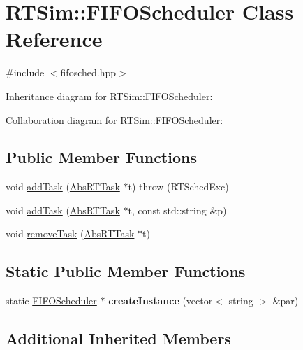 \hypertarget{classRTSim_1_1FIFOScheduler}{}\section{R\+T\+Sim\+:\+:F\+I\+F\+O\+Scheduler Class Reference}
\label{classRTSim_1_1FIFOScheduler}


{\ttfamily \#include $<$fifosched.\+hpp$>$}



Inheritance diagram for R\+T\+Sim\+:\+:F\+I\+F\+O\+Scheduler\+:


Collaboration diagram for R\+T\+Sim\+:\+:F\+I\+F\+O\+Scheduler\+:
\subsection*{Public Member Functions}
\begin{DoxyCompactItemize}
\item 
void \hyperlink{classRTSim_1_1FIFOScheduler_ae5903b9623629b109aa2005e6e1726fa}{add\+Task} (\hyperlink{classRTSim_1_1AbsRTTask}{Abs\+R\+T\+Task} $\ast$t)  throw (\+R\+T\+Sched\+Exc)
\item 
void \hyperlink{classRTSim_1_1FIFOScheduler_a28a58e39cb902e4223595954e53df193}{add\+Task} (\hyperlink{classRTSim_1_1AbsRTTask}{Abs\+R\+T\+Task} $\ast$t, const std\+::string \&p)
\item 
void \hyperlink{classRTSim_1_1FIFOScheduler_abce461f0e71d448175e1edcc3ce340a7}{remove\+Task} (\hyperlink{classRTSim_1_1AbsRTTask}{Abs\+R\+T\+Task} $\ast$t)
\end{DoxyCompactItemize}
\subsection*{Static Public Member Functions}
\begin{DoxyCompactItemize}
\item 
static \hyperlink{classRTSim_1_1FIFOScheduler}{F\+I\+F\+O\+Scheduler} $\ast$ {\bfseries create\+Instance} (vector$<$ string $>$ \&par)\hypertarget{classRTSim_1_1FIFOScheduler_a72e2beee458b0f9541f156f7ebd9b7e7}{}\label{classRTSim_1_1FIFOScheduler_a72e2beee458b0f9541f156f7ebd9b7e7}

\end{DoxyCompactItemize}
\subsection*{Additional Inherited Members}



